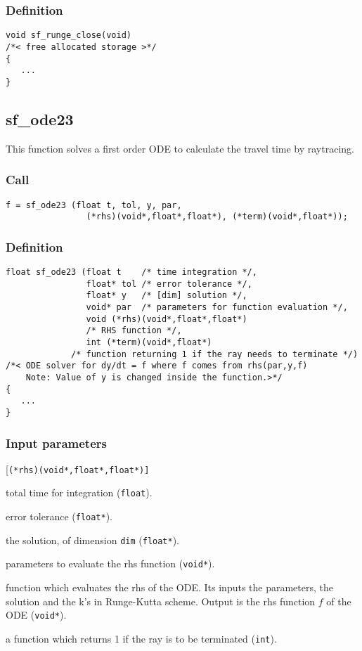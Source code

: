 \subsubsection*{Definition}
\begin{verbatim}
void sf_runge_close(void)
/*< free allocated storage >*/
{
   ...
}
\end{verbatim}




\subsection{{sf\_ode23}}
This function solves a first order ODE to calculate the travel time by raytracing.

\subsubsection*{Call}
\begin{verbatim}
f = sf_ode23 (float t, tol, y, par, 
                (*rhs)(void*,float*,float*), (*term)(void*,float*));
\end{verbatim}

\subsubsection*{Definition}
\begin{verbatim}
float sf_ode23 (float t    /* time integration */,
                float* tol /* error tolerance */,
                float* y   /* [dim] solution */, 
                void* par  /* parameters for function evaluation */,
                void (*rhs)(void*,float*,float*) 
                /* RHS function */, 
                int (*term)(void*,float*)
             /* function returning 1 if the ray needs to terminate */)
/*< ODE solver for dy/dt = f where f comes from rhs(par,y,f)
    Note: Value of y is changed inside the function.>*/
{
   ...
}
\end{verbatim}

\subsubsection*{Input parameters}
\begin{desclist}{\tt }{\quad}[\tt (*rhs)(void*,float*,float*)]
   \setlength\itemsep{0pt}
   \item[t]   total time for integration (\texttt{float}). 
   \item[tol] error tolerance (\texttt{float*}).  
   \item[y]   the solution, of dimension \texttt{dim} (\texttt{float*}).  
   \item[par] parameters to evaluate the rhs function (\texttt{void*}). 
   \item[(*rhs)(void*,float*,float*)] function which evaluates the rhs of the ODE. Its inputs the parameters, the solution and the k's in Runge-Kutta scheme. Output is the rhs function $f$ of the ODE (\texttt{void*}).
   \item[(*term)(void*,float*)] a function which returns 1 if the ray is to be terminated (\texttt{int}).
\end{desclist}

